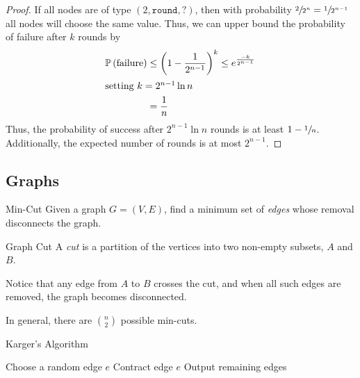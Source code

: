 \begin{proof}
    If all nodes are of type $(2, \texttt{round}, ?)$, then with probability
    $\sfrac{2}{2^n} = \sfrac{1}{2^{n-1}}$ all nodes will choose the same value.
    Thus, we can upper bound the probability of failure after $k$ rounds by
    \begin{align*}\operatorname{\mathbb{P}}\left(\text{failure}\right)
        &\leq \left(1 - \frac{1}{2^{n-1}}\right)^k \leq e^{\frac{-k}{2^{n-1}}}\\
        \shortintertext{setting $k=2^{n-1}\ln{n}$}
        &=\frac{1}{n}
    \end{align*}
    Thus, the probability of success after $2^{n-1}\ln{n}$ rounds is at least $1
    - \sfrac{1}{n}$. Additionally, the expected number of rounds is at most
    $2^{n-1}$.
\end{proof}

\subsection{Graphs}
\begin{problem}{Min-Cut}{}
    Given a graph $G = (V, E)$, find a minimum set of \emph{edges} whose removal
    disconnects the graph.
\end{problem}

\begin{definition}{Graph Cut}{}
    A \emph{cut} is a partition of the vertices into two non-empty subsets, $A$
    and $B$.
\end{definition}

Notice that any edge from $A$ to $B$ crosses the cut, and when all such edges
are removed, the graph becomes disconnected. 


In general, there are $\binom{n}{2}$ possible min-cuts.


\begin{algorithm}
    \caption{Karger's Algorithm}
    \label{alg:karger}
    \begin{algorithmic}[1]
                \State Choose a random edge $e$ \label{line:kargersample}
                \State Contract edge $e$ \label{line:kargercontraction}
            \EndForRange
            \State Output remaining edges
        \EndProcedure
    \end{algorithmic}
\end{algorithm}

